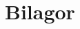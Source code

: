 \documentclass[a4paper,12pt]{article}
\begin{document}


\newpage
\appendix
\section{Bilagor} \label{app:rules}
%
%


%
%
\end{document}
